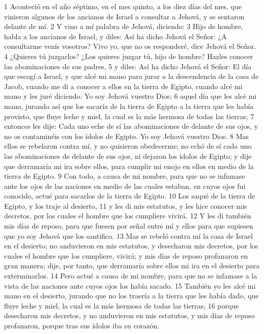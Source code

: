 1 Aconteció en el año séptimo, en el mes quinto, a los diez días del mes, que vinieron algunos de los ancianos de Israel a consultar a Jehová, y se sentaron delante de mí.
2 Y vino a mí palabra de Jehová, diciendo:
3 Hijo de hombre, habla a los ancianos de Israel, y diles: Así ha dicho Jehová el Señor: ¿A consultarme venís vosotros? Vivo yo, que no os responderé, dice Jehová el Señor.
4 ¿Quieres tú juzgarlos? ¿Los quieres juzgar tú, hijo de hombre? Hazles conocer las abominaciones de sus padres, 
5 y diles: Así ha dicho Jehová el Señor: El día que escogí a Israel, y que alcé mi mano para jurar a la descendencia de la casa de Jacob, cuando me di a conocer a ellos en la tierra de Egipto, cuando alcé mi mano y les juré diciendo: Yo soy Jehová vuestro Dios;
6 aquel día que les alcé mi mano, jurando así que los sacaría de la tierra de Egipto a la tierra que les había provisto, que fluye leche y miel, la cual es la más hermosa de todas las tierras; 
7 entonces les dije: Cada uno eche de sí las abominaciones de delante de sus ojos, y no os contaminéis con los ídolos de Egipto. Yo soy Jehová vuestro Dios.
8 Mas ellos se rebelaron contra mí, y no quisieron obedecerme; no echó de sí cada uno las abominaciones de delante de sus ojos, ni dejaron los ídolos de Egipto; y dije que derramaría mi ira sobre ellos, para cumplir mi enojo en ellos en medio de la tierra de Egipto.
9 Con todo, a causa de mi nombre, para que no se infamase ante los ojos de las naciones en medio de las cuales estaban, en cuyos ojos fui conocido, actué para sacarlos de la tierra de Egipto.
10 Los saqué de la tierra de Egipto, y los traje al desierto,
11 y les di mis estatutos, y les hice conocer mis decretos, por los cuales el hombre que los cumpliere vivirá.
12 Y les di también mis días de reposo, para que fuesen por señal entre mí y ellos para que supiesen que yo soy Jehová que los santifico.
13 Mas se rebeló contra mí la casa de Israel en el desierto; no anduvieron en mis estatutos, y desecharon mis decretos, por los cuales el hombre que los cumpliere, vivirá; y mis días de reposo profanaron en gran manera; dije, por tanto, que derramaría sobre ellos mi ira en el desierto para exterminarlos.
14 Pero actué a causa de mi nombre, para que no se infamase a la vista de las naciones ante cuyos ojos los había sacado.
15 También yo les alcé mi mano en el desierto, jurando que no los traería a la tierra que les había dado, que fluye leche y miel, la cual es la más hermosa de todas las tierras;
16 porque desecharon mis decretos, y no anduvieron en mis estatutos, y mis días de reposo profanaron, porque tras sus ídolos iba su corazón.
